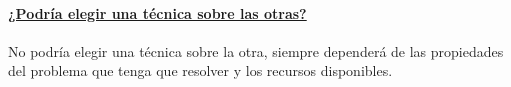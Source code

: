 \documentclass[../tp2_grupo404.tex]{subfiles}
\begin{document}
\paragraph{\underline{¿Podría elegir una técnica sobre las otras?}}\leavevmode

No podría elegir una técnica sobre la otra, siempre dependerá de las propiedades
del problema que tenga que resolver y los recursos disponibles.

\end{document}
